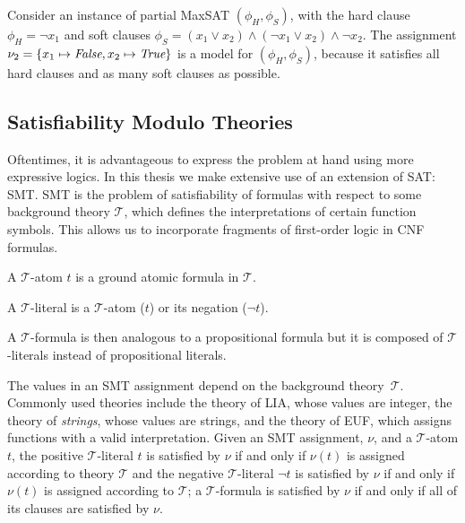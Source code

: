 \begin{example}
Consider an instance of partial \ac{MaxSAT} \((\phi_{H}, \phi_{S})\), with the hard clause \(\phi_{H} = \neg x_1\) and soft clauses \(\phi_{S} = (x_1 \lor x_2) \land (\neg x_1 \lor x_2) \land \neg x_2\).
The assignment \(\nu_2 = \{x_1 \mapsto \textit{False}, x_2 \mapsto \textit{True}\}\) is a model for \((\phi_{H}, \phi_{S})\), because it satisfies all hard clauses and as many soft clauses as possible.
\end{example}



\subsection{Satisfiability Modulo Theories}

Oftentimes, it is advantageous to express the problem at hand using more expressive logics. In this thesis we make extensive use of an extension of \ac{SAT}: \acf{SMT}. \ac{SMT} is the problem of satisfiability of formulas with respect to some background theory \(\mathcal{T}\), which defines the interpretations of certain function symbols. This allows us to incorporate fragments of first-order logic in \ac{CNF} formulas.

\begin{definition}
A \(\mathcal{T}\)-atom \(t\) is a ground atomic formula in \(\mathcal{T}\).
\end{definition}


\begin{definition}
A \(\mathcal{T}\)-literal is a \(\mathcal{T}\)-atom (\(t\)) or its negation (\(\neg t\)).
\end{definition}

\begin{definition}
A \(\mathcal{T}\)-formula is then analogous to a propositional formula but it is composed of \(\mathcal{T}\)-literals instead of propositional literals.
\end{definition}

\noindent
The values in an \ac{SMT} assignment depend on the background theory~\(\mathcal{T}\). Commonly used theories include the theory of \ac{LIA}, whose values are integer, the theory of \textit{strings}, whose values are strings, and the theory of \ac{EUF}, which assigns functions with a valid interpretation. Given an \ac{SMT} assignment, \(\nu\), and a \(\mathcal{T}\)-atom \(t\), the positive \(\mathcal{T}\)-literal \(t\) is satisfied by \(\nu\) if and only if \(\nu(t)\) is assigned \true according to theory \(\mathcal{T}\) and the negative \(\mathcal{T}\)-literal \(\neg t\) is satisfied by \(\nu\) if and only if \(\nu(t)\) is assigned \false according to \(\mathcal{T}\); a \(\mathcal{T}\)-formula is satisfied by \(\nu\) if and only if all of its clauses are satisfied by \(\nu\).

